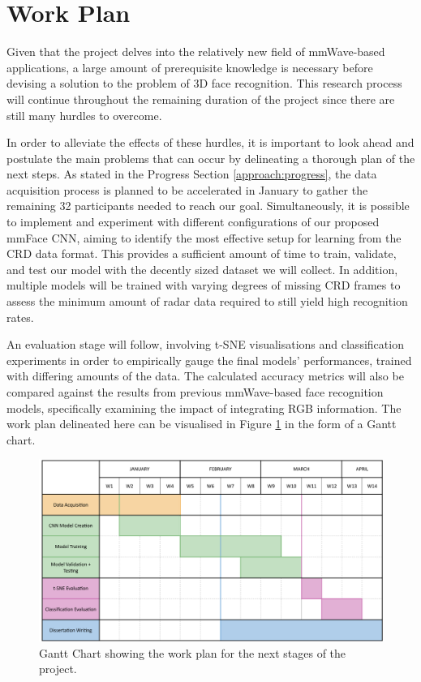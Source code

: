 \documentclass{interim}
\begin{document}
\section{Work Plan}
Given that the project delves into the relatively new field of mmWave-based applications, a large amount of prerequisite knowledge is necessary before devising a solution to the problem of 3D face recognition. This research process will continue throughout the remaining duration of the project since there are still many hurdles to overcome. 

In order to alleviate the effects of these hurdles, it is important to look ahead and postulate the main problems that can occur by delineating a thorough plan of the next steps. As stated in the Progress Section \ref{approach:progress}, the data acquisition process is planned to be accelerated in January to gather the remaining 32 participants needed to reach our goal. Simultaneously, it is possible to implement and experiment with different configurations of our proposed mmFace CNN, aiming to identify the most effective setup for learning from the CRD data format. This provides a sufficient amount of time to train, validate, and test our model with the decently sized dataset we will collect. In addition, multiple models will be trained with varying degrees of missing CRD frames to assess the minimum amount of radar data required to still yield high recognition rates.

An evaluation stage will follow, involving t-SNE visualisations and classification experiments in order to empirically gauge the final models' performances, trained with differing amounts of the data. The calculated accuracy metrics will also be compared against the results from previous mmWave-based face recognition models, specifically examining the impact of integrating RGB information. The work plan delineated here can be visualised in Figure \ref{fig:gantt_chart} in the form of a Gantt chart.

\begin{figure}[h!]
    \centering
    \includegraphics[width=1\textwidth]{images/gantt_chart.pdf}
    \vspace{0.1cm}
    \caption{Gantt Chart showing the work plan for the next stages of the project.}
    \label{fig:gantt_chart}
\end{figure}




\end{document}
